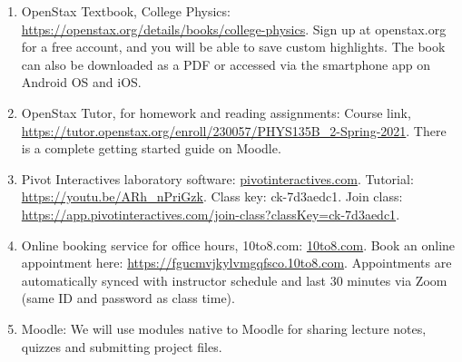 \documentclass[10pt]{article}
\begin{document}
\begin{enumerate}
\item OpenStax Textbook, College Physics: \url{https://openstax.org/details/books/college-physics}.  Sign up at openstax.org for a free account, and you will be able to save custom highlights.  The book can also be downloaded as a PDF or accessed via the smartphone app on Android OS and iOS.
\item OpenStax Tutor, for homework and reading assignments: Course link, \url{https://tutor.openstax.org/enroll/230057/PHYS135B_2-Spring-2021}.  There is a complete getting started guide on Moodle.
\item Pivot Interactives laboratory software: \url{pivotinteractives.com}. Tutorial: \url{https://youtu.be/ARh_nPriGzk}.  Class key: ck-7d3aedc1.  Join class: \url{https://app.pivotinteractives.com/join-class?classKey=ck-7d3aedc1}.
\item Online booking service for office hours, 10to8.com: \url{10to8.com}.  Book an online appointment here: \url{https://fgucmvjkylvmgqfsco.10to8.com}.  Appointments are automatically synced with instructor schedule and last 30 minutes via Zoom (same ID and password as class time).
\item Moodle: We will use modules native to Moodle for sharing lecture notes, quizzes and submitting project files. 
\end{enumerate}
\end{document}
